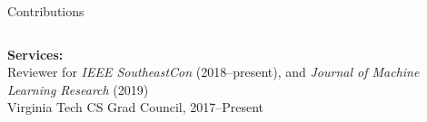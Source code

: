\documentclass[xcolor=dvipsnames]{beamer}
\begin{document}
\begin{frame}{Contributions}
\begin{columns}
\begin{column}{.48\textwidth}
\smallskip
\textbf{Services:}\\
\smallskip
{\tiny
{Reviewer for {\it IEEE SoutheastCon} (2018--present),
and {\it Journal of Machine Learning Research} (2019)}\\
\smallskip
{Virginia Tech CS Grad Council, 2017--Present}\\
}
\end{column}
\end{columns}
\end{frame}
\end{document}
